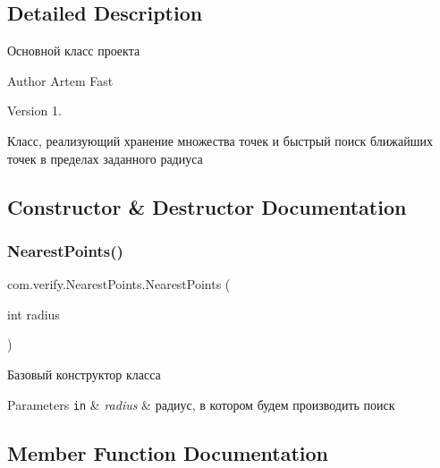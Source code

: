 \subsection{Detailed Description}
Основной класс проекта 

\begin{DoxyAuthor}{Author}
Artem Fast 
\end{DoxyAuthor}
\begin{DoxyVersion}{Version}
1. 
\end{DoxyVersion}
Класс, реализующий хранение множества точек и быстрый поиск ближайших точек в пределах заданного радиуса 

\subsection{Constructor \& Destructor Documentation}
\mbox{\label{classcom_1_1verify_1_1_nearest_points_ad89051cbce423dbe3599bd7a91f9589c}} 
\subsubsection{\texorpdfstring{Nearest\+Points()}{NearestPoints()}}
{\footnotesize\ttfamily com.\+verify.\+Nearest\+Points.\+Nearest\+Points (\begin{DoxyParamCaption}\item[{int}]{radius }\end{DoxyParamCaption})}

Базовый конструктор класса 
\begin{DoxyParams}[1]{Parameters}
\mbox{\tt in}  & {\em radius} & радиус, в котором будем производить поиск \\
\hline
\end{DoxyParams}


\subsection{Member Function Documentation}
\mbox{\label{classcom_1_1verify_1_1_nearest_points_a3252dc1f231e0925565d515194280a63}} 
